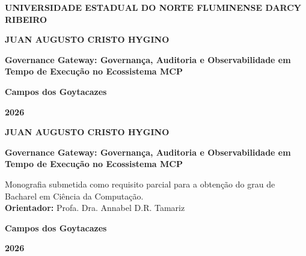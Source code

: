 \documentclass[12pt,a4paper]{report}
\begin{document}
\begin{titlepage}
  \centering
  {\large \textbf{UNIVERSIDADE ESTADUAL DO NORTE FLUMINENSE DARCY RIBEIRO}\par}
  \vspace*{3cm}
  {\large \textbf{JUAN AUGUSTO CRISTO HYGINO}\par}
  \vspace{5cm}
  {\large \textbf{Governance Gateway: Governança, Auditoria e Observabilidade em Tempo de Execução no Ecossistema MCP}\par}
  \vfill
  {\large \textbf{Campos dos Goytacazes}\par}
  {\large \textbf{2026}\par}
  \vspace*{1cm}
\end{titlepage}

\begin{titlepage}
  \centering
  \vspace*{1cm}
  {\large \textbf{JUAN AUGUSTO CRISTO HYGINO}\par}
  \vspace{4.5cm}
  {\large \textbf{Governance Gateway: Governança, Auditoria e Observabilidade em Tempo de Execução no Ecossistema MCP}\par}
  \vspace{2.5cm}
  \hfill
  \begin{minipage}{0.52\textwidth}
    \linespread{1.1}\selectfont
    Monografia submetida como requisito parcial para a obtenção do grau de Bacharel em Ciência da Computação.\\[0.4cm]
    \textbf{Orientador:} Profa. Dra. Annabel D.R. Tamariz
  \end{minipage}
  \vfill
  {\large \textbf{Campos dos Goytacazes}\par}

  {\large \textbf{2026}\par}
  \vspace*{1cm}
\end{titlepage}

\tableofcontents
\thispagestyle{empty}
\clearpage

\setcounter{page}{1}





\clearpage
{}
{}

\end{document}
